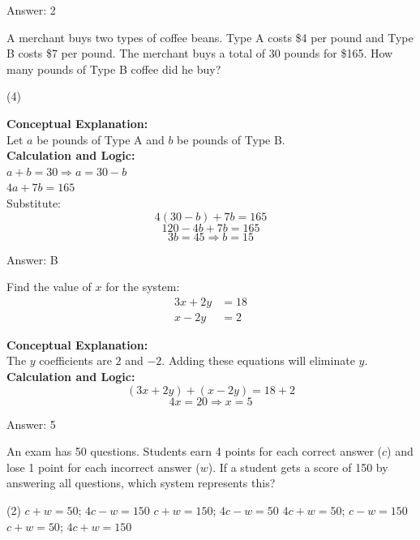 \documentclass[11pt,paper=a4,answers]{exam}
\begin{document}
\begin{questions}
\begin{solution}
\vspace{15pt}
Answer: \colorbox{yellow!100}{2}
\end{solution}

\question
A merchant buys two types of coffee beans. Type A costs \$4 per pound and Type B costs \$7 per pound. The merchant buys a total of 30 pounds for \$165. How many pounds of Type B coffee did he buy?
\begin{tasks}(4)
\end{tasks}

\begin{solution}
\textbf{Conceptual Explanation:} \\
Let $a$ be pounds of Type A and $b$ be pounds of Type B.
\\[10pt]
\textbf{Calculation and Logic:} \\
$a + b = 30 \Rightarrow a = 30 - b$ \\
$4a + 7b = 165$ \\
Substitute:
\[4(30 - b) + 7b = 165\]
\[120 - 4b + 7b = 165\]
\[3b = 45 \Rightarrow b = 15\]

\vspace{15pt}
Answer: \colorbox{yellow!100}{B}
\end{solution}

\question
Find the value of $x$ for the system:
\begin{align*}
3x + 2y &= 18 \\
x - 2y &= 2
\end{align*}

\begin{solution}
\textbf{Conceptual Explanation:} \\
The $y$ coefficients are $2$ and $-2$. Adding these equations will eliminate $y$.
\\[10pt]
\textbf{Calculation and Logic:} \\
\[(3x + 2y) + (x - 2y) = 18 + 2\]
\[4x = 20 \Rightarrow x = 5\]

\vspace{15pt}
Answer: \colorbox{yellow!100}{5}
\end{solution}

\question
An exam has 50 questions. Students earn 4 points for each correct answer ($c$) and lose 1 point for each incorrect answer ($w$). If a student gets a score of 150 by answering all questions, which system represents this?
\begin{tasks}(2)
    \task $c + w = 50$; $4c - w = 150$
    \task $c + w = 150$; $4c - w = 50$
    \task $4c + w = 50$; $c - w = 150$
    \task $c + w = 50$; $4c + w = 150$
\end{tasks}


\end{questions}
\end{document}
